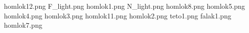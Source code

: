 homlok12.png
F_light.png
homlok1.png
N_light.png
homlok8.png
homlok5.png
homlok4.png
homlok3.png
homlok11.png
homlok2.png
teto1.png
falak1.png
homlok7.png
